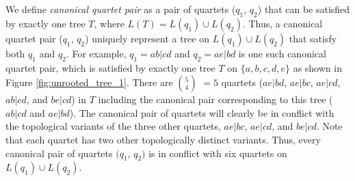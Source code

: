 \documentclass[runningheads]{llncs}
\newcommand{\add}[1]{{\color{blue} #1}}
\newcommand{\addb}[1]{{\color{red} #1}}
\begin{document}


We define \textit{canonical quartet pair} as a pair of quartets ($q_1$, $q_2$) that can be satisfied by exactly one tree $T$, where $L(T) = L(q_1) \cup L(q_2)$. Thus, a canonical quartet pair ($q_1$, $q_2$) uniquely represent a tree on $L(q_1) \cup L(q_2)$ that satisfy both $q_1$ and $q_2$. For example, $q_1 = ab|cd$ and $q_2 = ae|bd$ %
is one such canonical quartet pair, which is satisfied by exactly one tree $T$ on $\{a,b,c,d,e\}$ as shown in Figure \ref{fig:unrooted_tree_1}. There are $5 \choose 4$ $=5$ quartets ($ae|bd$, $ae|bc$, $ae|cd$, $ab|cd$, and $be|cd$) in $T$ including the canonical pair corresponding to this tree ($ab|cd$ and $ae|bd$). The canonical pair of quartets will clearly be in conflict with the topological variants of the three other quartets, $ae|bc$, $ae|cd$, and $be|cd$. Note that each quartet has two other topologically distinct variants. Thus, every canonical pair of quartets $(q_1$, $q_2)$ is in conflict with six quartets on $L(q_1) \cup L(q_2)$.







\end{document}
